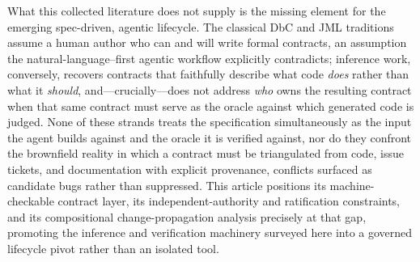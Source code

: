 What this collected literature does not supply is the missing element for the emerging spec-driven, agentic lifecycle. The classical DbC and JML traditions assume a human author who can and will write formal contracts, an assumption the natural-language–first agentic workflow explicitly contradicts; inference work, conversely, recovers contracts that faithfully describe what code \emph{does} rather than what it \emph{should}, and---crucially---does not address \emph{who} owns the resulting contract when that same contract must serve as the oracle against which generated code is judged. None of these strands treats the specification simultaneously as the input the agent builds against and the oracle it is verified against, nor do they confront the brownfield reality in which a contract must be triangulated from code, issue tickets, and documentation with explicit provenance, conflicts surfaced as candidate bugs rather than suppressed. This article positions its machine-checkable contract layer, its independent-authority and ratification constraints, and its compositional change-propagation analysis precisely at that gap, promoting the inference and verification machinery surveyed here into a governed lifecycle pivot rather than an isolated tool.
